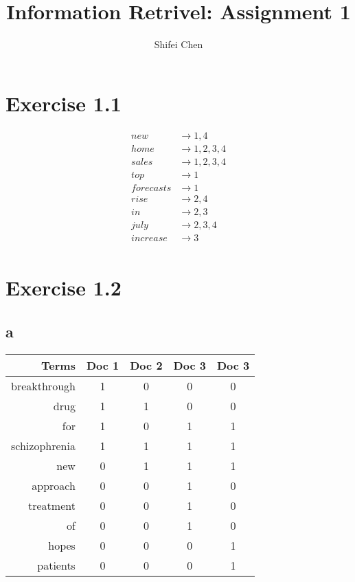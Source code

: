 \documentclass[11pt]{article} %
\title{{\LARGE Information Retrivel: Assignment 1}\\[1.5mm]} %
\author{Shifei Chen} %
\begin{document}
\maketitle

\section*{Exercise 1.1}

\begin{align*}
    new &\rightarrow 1, 4\\
    home &\rightarrow 1, 2, 3, 4\\
    sales &\rightarrow 1, 2, 3, 4\\
    top &\rightarrow 1\\
    forecasts &\rightarrow 1\\
    rise &\rightarrow 2, 4\\
    in &\rightarrow 2, 3\\
    july &\rightarrow 2, 3, 4\\
    increase &\rightarrow 3\\
\end{align*}

\section*{Exercise 1.2}

\subsection*{a}

\begin{table}[h]
    \begin{center}
        \begin{tabular}{r|c|c|c|c}
            \textbf{Terms} & \textbf{Doc 1} & \textbf{Doc 2} & \textbf{Doc 3} & \textbf{Doc 3}\\
            \hline
            breakthrough & 1 & 0 & 0 & 0\\
            drug & 1 & 1 & 0 & 0\\
            for & 1 & 0 & 1 & 1\\
            schizophrenia & 1 & 1 & 1 & 1\\
            new & 0 & 1 & 1 & 1\\
            approach & 0 & 0 & 1 & 0\\
            treatment & 0 & 0 & 1 & 0\\
            of & 0 & 0 & 1 & 0\\
            hopes & 0 & 0 & 0 & 1\\
            patients & 0 & 0 & 0 & 1\\
        \end{tabular}
    \end{center}
\end{table}
\end{document}
